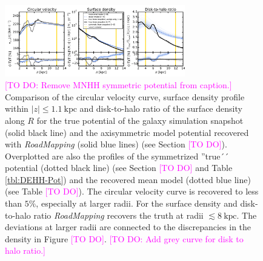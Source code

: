 \documentclass[iop,revtex4,numberedappendix,appendixfloats]{emulateapj}
\newcommand{\RM}{{\sl RoadMapping}}
\newcommand{\Wilma}[1]{\textcolor{Magenta}{#1}}
\begin{document}
\begin{figure}[!htbp]
\centering
\includegraphics[width=0.7\textwidth]{fig/MNdHHdiffSph2_4kpc8Spiral_a_test1_vcirc_surfdens_overview.pdf}
\caption{\Wilma{[TO DO: Remove MNHH symmetric potential from caption.]} Comparison of the circular velocity curve, surface density profile within $|z|\leq1.1~\text{kpc}$ and disk-to-halo ratio of the surface density along $R$ for the true potential of the galaxy simulation snapshot (solid black line) and the axisymmetric model potential recovered with \RM{} (solid blue lines) (see Section \Wilma{[TO DO]}). Overplotted are also the profiles of the symmetrized ''true´´ potential (dotted black line) (see Section \Wilma{[TO DO]} and Table \ref{tbl:DEHH-Pot}) and the recovered mean model (dotted blue line) (see Table \Wilma{[TO DO]}). The circular velocity curve is recovered to less than $5\%$, especially at larger radii. For the surface density and disk-to-halo ratio \RM{} recovers the truth at radii $\lesssim 8~\text{kpc}$. The deviations at larger radii are connected to the discrepancies in the density in Figure \Wilma{[TO DO]}. \Wilma{[TO DO: Add grey curve for disk to halo ratio.]}}
\label{fig:4kpc8Spiral_vcirc_surfdens}
\end{figure}
\end{document}
